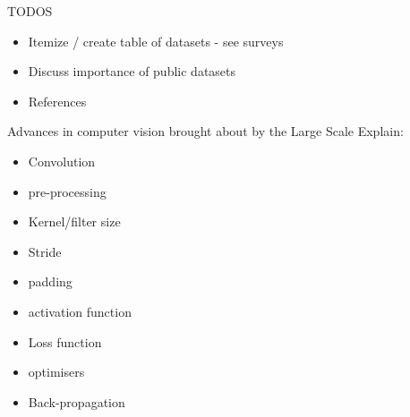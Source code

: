 TODOS

\begin{itemize}
    \item Itemize / create table of datasets - see surveys
    \item Discuss importance of public datasets
    \item References
\end{itemize}

Advances in computer vision brought about by the Large Scale 
Explain:  
\begin{itemize}
    \item Convolution
    \item pre-processing
    \item Kernel/filter size
    \item Stride
    \item padding
    \item activation function
    \item Loss function
    \item optimisers
    \item Back-propagation
\end{itemize}


